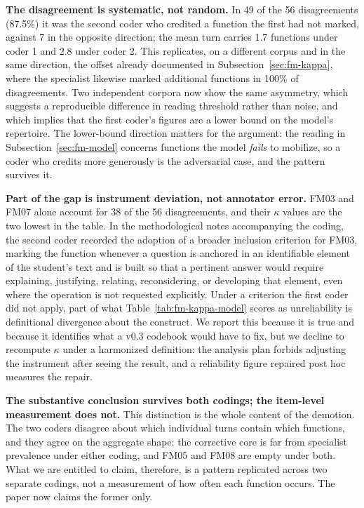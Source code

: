 \documentclass{sbc2023}%
\begin{document}
\textbf{The disagreement is systematic, not random.} In 49 of the 56 disagreements (87.5\%) it was the second coder who credited a function the first had not marked, against 7 in the opposite direction; the mean turn carries 1.7 functions under coder 1 and 2.8 under coder 2. This replicates, on a different corpus and in the same direction, the offset already documented in Subsection~\ref{sec:fm-kappa}, where the specialist likewise marked additional functions in 100\% of disagreements. Two independent corpora now show the same asymmetry, which suggests a reproducible difference in reading threshold rather than noise, and which implies that the first coder's figures are a lower bound on the model's repertoire. The lower-bound direction matters for the argument: the reading in Subsection~\ref{sec:fm-model} concerns functions the model \textit{fails} to mobilize, so a coder who credits more generously is the adversarial case, and the pattern survives it.

\textbf{Part of the gap is instrument deviation, not annotator error.} FM03 and FM07 alone account for 38 of the 56 disagreements, and their $\kappa$ values are the two lowest in the table. In the methodological notes accompanying the coding, the second coder recorded the adoption of a broader inclusion criterion for FM03, marking the function whenever a question is anchored in an identifiable element of the student's text and is built so that a pertinent answer would require explaining, justifying, relating, reconsidering, or developing that element, even where the operation is not requested explicitly. Under a criterion the first coder did not apply, part of what Table~\ref{tab:fm-kappa-model} scores as unreliability is definitional divergence about the construct. We report this because it is true and because it identifies what a v0.3 codebook would have to fix, but we decline to recompute $\kappa$ under a harmonized definition: the analysis plan forbids adjusting the instrument after seeing the result, and a reliability figure repaired post hoc measures the repair.

\textbf{The substantive conclusion survives both codings; the item-level measurement does not.} This distinction is the whole content of the demotion. The two coders disagree about which individual turns contain which functions, and they agree on the aggregate shape: the corrective core is far from specialist prevalence under either coding, and FM05 and FM08 are empty under both. What we are entitled to claim, therefore, is a pattern replicated across two separate codings, not a measurement of how often each function occurs. The paper now claims the former only.
\end{document}
